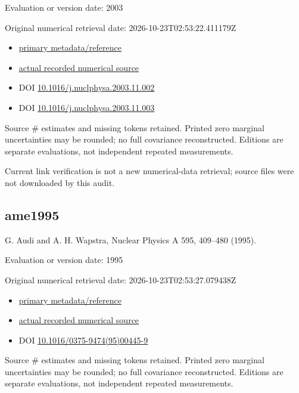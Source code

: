 \documentclass[
  11pt,
  letterpaper,
]{article}
\providecommand{\tightlist}{%
  \setlength{\itemsep}{0pt}\setlength{\parskip}{0pt}}
\begin{document}
Evaluation or version date: 2003

Original numerical retrieval date: 2026-10-23T02:53:22.411179Z

\begin{itemize}
\tightlist
\item
  \href{https://www-nds.iaea.org/amdc/}{primary metadata/reference}
\item
  \href{https://amdc.impcas.ac.cn/masstables/Ame2003/mass.mas03}{actual
  recorded numerical source}
\item
  DOI
  \href{https://doi.org/10.1016/j.nuclphysa.2003.11.002}{10.1016/j.nuclphysa.2003.11.002}
\item
  DOI
  \href{https://doi.org/10.1016/j.nuclphysa.2003.11.003}{10.1016/j.nuclphysa.2003.11.003}
\end{itemize}

Source \# estimates and missing tokens retained. Printed zero marginal
uncertainties may be rounded; no full covariance reconstructed. Editions
are separate evaluations, not independent repeated measurements.

Current link verification is not a new numerical-data retrieval; source
files were not downloaded by this audit.

\subsection{ame1995}\label{ame1995}

G. Audi and A. H. Wapstra, Nuclear Physics A 595, 409--480 (1995).

Evaluation or version date: 1995

Original numerical retrieval date: 2026-10-23T02:53:27.079438Z

\begin{itemize}
\tightlist
\item
  \href{https://www-nds.iaea.org/amdc/}{primary metadata/reference}
\item
  \href{https://amdc.impcas.ac.cn/masstables/Ame1995/mass_rmd.mas95}{actual
  recorded numerical source}
\item
  DOI
  \href{https://doi.org/10.1016/0375-9474(95)00445-9}{10.1016/0375-9474(95)00445-9}
\end{itemize}

Source \# estimates and missing tokens retained. Printed zero marginal
uncertainties may be rounded; no full covariance reconstructed. Editions
are separate evaluations, not independent repeated measurements.
\end{document}

